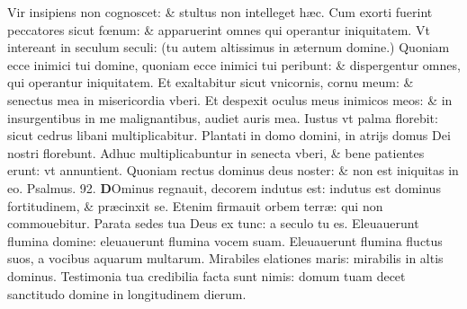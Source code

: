 \documentclass[a5paper,10pt]{book}
\def\ae{æ}
\def\oe{œ}
\begin{document}
\begin{multicols*}{2}
\newline \color{red} V\color{black}ir insipiens non cognoscet: \& stultus non intelleget h\ae c.
\newline \color{red} C\color{black}um exorti fuerint peccatores sicut f\oe num: \& apparuerint omnes qui operantur iniquitatem.
\newline \color{red} V\color{black}t intereant in seculum seculi: (tu autem altissimus in \ae ternum domine.)
\newline \color{red} Q\color{black}uoniam ecce inimici tui domine, quoniam ecce inimici tui peribunt: \& dispergentur omnes, qui operantur iniquitatem.
\newline \color{red} E\color{black}t exaltabitur sicut vnicornis, cornu meum: \& senectus mea in misericordia vberi.
\newline \color{red} E\color{black}t despexit oculus meus inimicos meos: \& in insurgentibus in me malignantibus, audiet auris mea.
\newline \color{red} I\color{black}ustus vt palma florebit: sicut cedrus libani multiplicabitur.
\newline \color{red} P\color{black}lantati in domo domini, in atrijs domus Dei nostri florebunt.
\newline \color{red} A\color{black}dhuc multiplicabuntur in senecta vberi, \& bene patientes erunt: vt annuntient.
\newline \color{red} Q\color{black}uoniam rectus dominus deus noster: \& non est iniquitas in eo. \color{red} Psalmus. \hypertarget{ps92}{92.} \color{black}
\vspace{-1.25em}
\lettrine[lines=2]{\bfseries \color{red} D}{}Ominus regnauit, decorem indutus est: indutus est dominus fortitudinem, \& pr\ae cinxit se.
\newline \color{red} E\color{black}tenim firmauit orbem terr\ae : qui non commouebitur.
\newline \color{red} P\color{black}arata sedes tua Deus ex tunc: a seculo tu es.%
\newline \color{red} E\color{black}leuauerunt flumina domine: eleuauerunt flumina vocem suam.
\newline \color{red} E\color{black}leuauerunt flumina fluctus suos, a vocibus aquarum multarum.
\newline \color{red} M\color{black}irabiles elationes maris: mirabilis in altis dominus.
\newline \color{red} T\color{black}estimonia tua credibilia facta sunt nimis: domum tuam decet sanctitudo domine in longitudinem dierum.

\end{multicols*}
\end{document}
